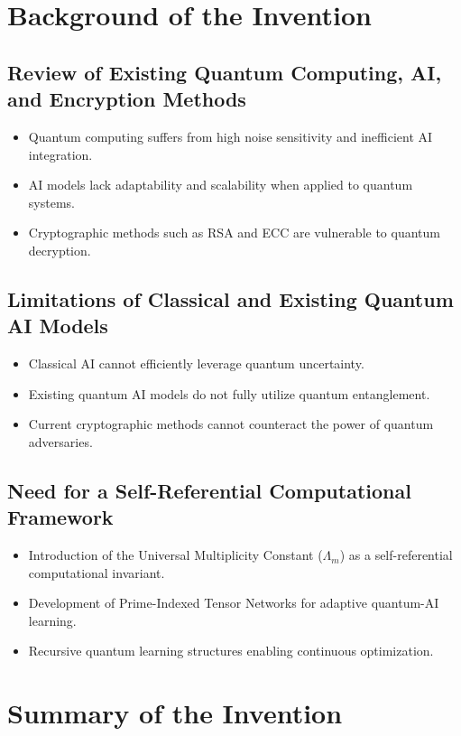 \documentclass{article}
\theoremstyle{plain}
\begin{document}
\section{Background of the Invention}

\subsection{Review of Existing Quantum Computing, AI, and Encryption Methods}
\begin{itemize}
    \item Quantum computing suffers from high noise sensitivity and inefficient AI integration.
    \item AI models lack adaptability and scalability when applied to quantum systems.
    \item Cryptographic methods such as RSA and ECC are vulnerable to quantum decryption.
\end{itemize}

\subsection{Limitations of Classical and Existing Quantum AI Models}
\begin{itemize}
    \item Classical AI cannot efficiently leverage quantum uncertainty.
    \item Existing quantum AI models do not fully utilize quantum entanglement.
    \item Current cryptographic methods cannot counteract the power of quantum adversaries.
\end{itemize}

\subsection{Need for a Self-Referential Computational Framework}
\begin{itemize}
    \item Introduction of the Universal Multiplicity Constant ($\Lambda_m$) as a self-referential computational invariant.
    \item Development of Prime-Indexed Tensor Networks for adaptive quantum-AI learning.
    \item Recursive quantum learning structures enabling continuous optimization.
\end{itemize}

\section{Summary of the Invention}
\end{document}
